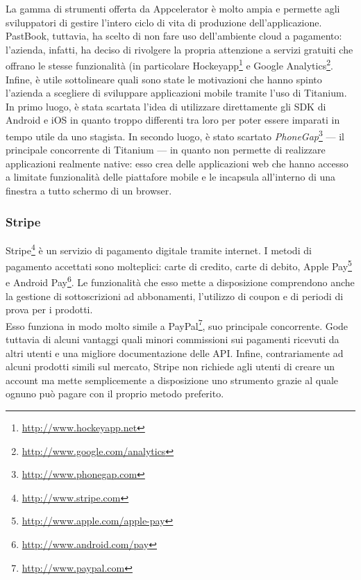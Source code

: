 				La gamma di strumenti offerta da Appcelerator è molto ampia e permette agli sviluppatori di gestire l'intero ciclo di
				vita di produzione dell'applicazione. PastBook, tuttavia, ha scelto di non fare uso dell'ambiente cloud a pagamento:
				l'azienda, infatti, ha deciso di rivolgere la propria attenzione a servizi gratuiti che offrano le stesse
				funzionalità (in particolare Hockeyapp\footnote{\url{http://www.hockeyapp.net}} e
				Google Analytics\footnote{\url{http://www.google.com/analytics}}.\\
				Infine, è utile sottolineare quali sono state le motivazioni che hanno spinto l'azienda a scegliere di sviluppare
				applicazioni mobile tramite l'uso di Titanium. In primo luogo, è stata scartata l'idea di utilizzare direttamente gli
				SDK di Android e iOS in quanto troppo differenti tra loro per poter essere imparati in tempo utile da uno stagista.
				In secondo luogo, è stato scartato \emph{PhoneGap}\footnote{\url{http://www.phonegap.com}} — il principale
				concorrente di Titanium — in quanto non permette di realizzare applicazioni realmente native: esso crea delle
				applicazioni web che hanno accesso a limitate funzionalità delle piattafore mobile e le incapsula all'interno di una
				finestra a tutto schermo di un browser.
			\subsubsection{Stripe}
				Stripe\footnote{\url{http://www.stripe.com}} è un servizio di pagamento digitale tramite internet. I metodi di
				pagamento accettati sono molteplici: carte di credito, carte di debito,
				Apple Pay\footnote{\url{http://www.apple.com/apple-pay}} e Android Pay\footnote{\url{http://www.android.com/pay}}. Le
				funzionalità che esso mette a disposizione comprendono anche la gestione di sottoscrizioni ad abbonamenti,
				l'utilizzo di coupon e di periodi di prova per i prodotti.\\
				Esso funziona in modo molto simile a PayPal\footnote{\url{http://www.paypal.com}}, suo principale concorrente.
				Gode tuttavia di alcuni vantaggi quali minori commissioni sui pagamenti ricevuti da altri utenti e una migliore
				documentazione delle API. Infine, contrariamente ad alcuni prodotti simili sul mercato, Stripe non richiede agli
				utenti di creare un account ma mette semplicemente a disposizione uno strumento grazie al quale ognuno può pagare
				con il proprio metodo preferito.
